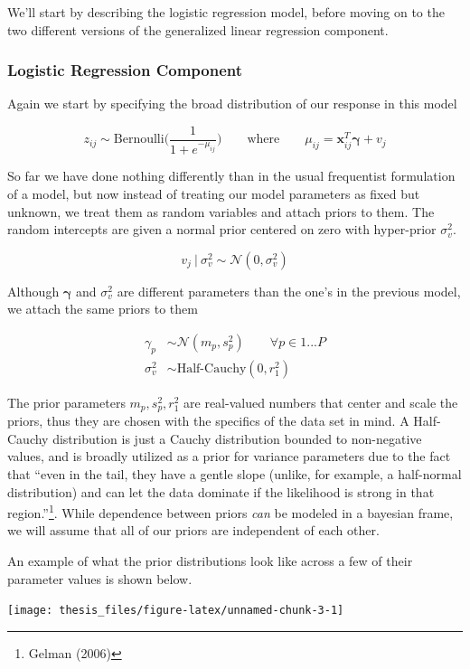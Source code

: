 \documentclass[12pt,twoside]{reedthesis}
\begin{document}
We'll start by describing the logistic regression model, before moving on to the two different versions of the generalized linear regression component.

\hypertarget{logistic-regression-component}{%
\subsubsection{Logistic Regression Component}\label{logistic-regression-component}}

Again we start by specifying the broad distribution of our response in this model

\[
z_{ij} \sim \text{Bernoulli}\Bigg(\frac{1}{1 + e^{-\mu_{ij}}}\Bigg) \qquad \text{where} \qquad \mu_{ij} =\mathbf{x}_{ij}^T\boldsymbol{\gamma} + v_j
\]

So far we have done nothing differently than in the usual frequentist formulation of a model, but now instead of treating our model parameters as fixed but unknown, we treat them as random variables and attach priors to them. The random intercepts are given a normal prior centered on zero with hyper-prior \(\sigma_v^2\).

\[
v_j \ | \ \sigma_{v}^2 \sim \mathcal{N}(0, \sigma_{v}^2)
\]

Although \(\boldsymbol{\gamma}\) and \(\sigma_{v}^2\) are different parameters than the one's in the previous model, we attach the same priors to them

\[
\begin{aligned}
\gamma_p &\sim \mathcal{N}(m_p, s_p^2)  \qquad \forall p\in 1...P \\
\sigma_{v}^2 &\sim \text{Half-Cauchy}(0, r_1^2)
\end{aligned}
\]

The prior parameters \(m_p, s_p^2, r_1^2\) are real-valued numbers that center and scale the priors, thus they are chosen with the specifics of the data set in mind. A Half-Cauchy distribution is just a Cauchy distribution bounded to non-negative values, and is broadly utilized as a prior for variance parameters due to the fact that ``even in the tail, they have a gentle slope (unlike, for example, a half-normal distribution) and can let the data dominate if the likelihood is strong in that region.''\footnote{Gelman (2006)}. While dependence between priors \emph{can} be modeled in a bayesian frame, we will assume that all of our priors are independent of each other.

An example of what the prior distributions look like across a few of their parameter values is shown below.
\begin{center}\texttt{[image: thesis\_files/figure-latex/unnamed-chunk-3-1]} \end{center}
\end{document}
